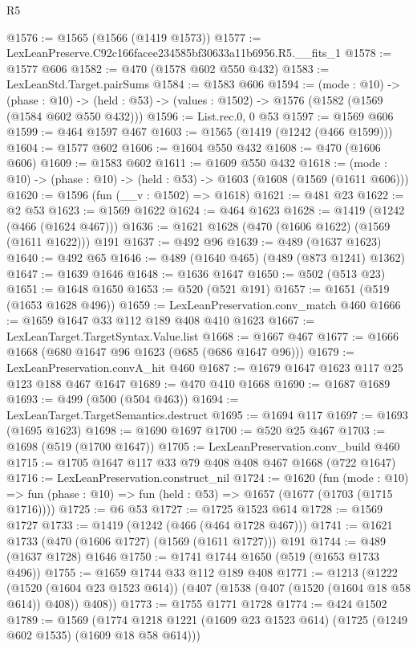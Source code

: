\begin{lexlean}{R5}
\begin{coremodule}
@1576 := @1565 (@1566 (@1419 @1573))
@1577 := LexLeanPreserve.C92c166facee234585bf30633a11b6956.R5.__fits_1
@1578 := @1577 @606
@1582 := @470 (@1578 @602 @550 @432)
@1583 := LexLeanStd.Target.pairSums
@1584 := @1583 @606
@1594 := (mode : @10) ->
  (phase : @10) -> (held : @53) -> (values : @1502) -> @1576 (@1582 (@1569 (@1584 @602 @550 @432)))
@1596 := List.rec.{0, 0} @53
@1597 := @1569 @606
@1599 := @464 @1597 @467
@1603 := @1565 (@1419 (@1242 (@466 @1599)))
@1604 := @1577 @602
@1606 := @1604 @550 @432
@1608 := @470 (@1606 @606)
@1609 := @1583 @602
@1611 := @1609 @550 @432
@1618 := (mode : @10) -> (phase : @10) -> (held : @53) -> @1603 (@1608 (@1569 (@1611 @606)))
@1620 := @1596 (fun (__v : @1502) => @1618)
@1621 := @481 @23
@1622 := @2 @53
@1623 := @1569 @1622
@1624 := @464 @1623
@1628 := @1419 (@1242 (@466 (@1624 @467)))
@1636 := @1621 @1628 (@470 (@1606 @1622) (@1569 (@1611 @1622))) @191
@1637 := @492 @96
@1639 := @489 (@1637 @1623)
@1640 := @492 @65
@1646 := @489 (@1640 @465) (@489 (@873 @1241) @1362)
@1647 := @1639 @1646
@1648 := @1636 @1647
@1650 := @502 (@513 @23)
@1651 := @1648 @1650
@1653 := @520 (@521 @191)
@1657 := @1651 (@519 (@1653 @1628 @496))
@1659 := LexLeanPreservation.conv_match @460
@1666 := @1659 @1647 @33 @112 @189 @408 @410 @1623
@1667 := LexLeanTarget.TargetSyntax.Value.list
@1668 := @1667 @467
@1677 := @1666 @1668 (@680 @1647 @96 @1623 (@685 (@686 @1647 @96)))
@1679 := LexLeanPreservation.convA_hit @460
@1687 := @1679 @1647 @1623 @117 @25 @123 @188 @467 @1647
@1689 := @470 @410 @1668
@1690 := @1687 @1689
@1693 := @499 (@500 (@504 @463))
@1694 := LexLeanTarget.TargetSemantics.destruct
@1695 := @1694 @117
@1697 := @1693 (@1695 @1623)
@1698 := @1690 @1697
@1700 := @520 @25 @467
@1703 := @1698 (@519 (@1700 @1647))
@1705 := LexLeanPreservation.conv_build @460
@1715 := @1705 @1647 @117 @33 @79 @408 @408 @467 @1668 (@722 @1647)
@1716 := LexLeanPreservation.construct_nil
@1724 := @1620
    (fun (mode : @10) =>
    fun (phase : @10) => fun (held : @53) => @1657 (@1677 (@1703 (@1715 @1716))))
@1725 := @6 @53
@1727 := @1725 @1523 @614
@1728 := @1569 @1727
@1733 := @1419 (@1242 (@466 (@464 @1728 @467)))
@1741 := @1621 @1733 (@470 (@1606 @1727) (@1569 (@1611 @1727))) @191
@1744 := @489 (@1637 @1728) @1646
@1750 := @1741 @1744 @1650 (@519 (@1653 @1733 @496))
@1755 := @1659 @1744 @33 @112 @189 @408
@1771 := @1213
    (@1222
      (@1520 (@1604 @23 @1523 @614))
      (@407 (@1538 (@407 (@1520 (@1604 @18 @58 @614)) @408)) @408))
@1773 := @1755 @1771 @1728
@1774 := @424 @1502
@1789 := @1569
    (@1774 @1218 @1221 (@1609 @23 @1523 @614) (@1725 (@1249 @602 @1535) (@1609 @18 @58 @614)))

\end{coremodule}
\end{lexlean}
